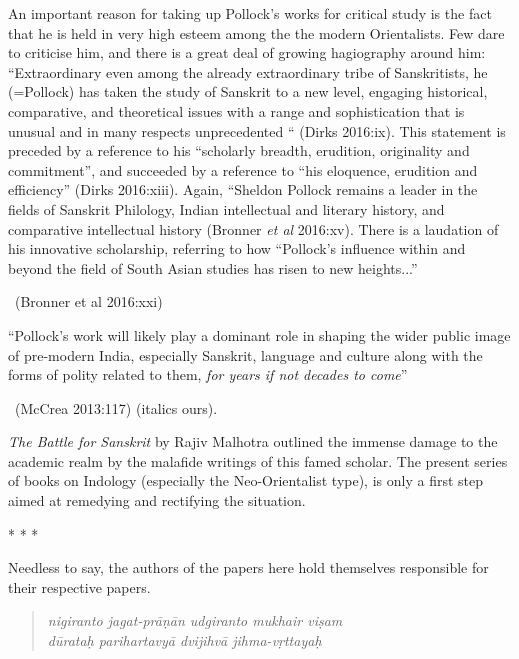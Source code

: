 \begin{myquote}
An important reason for taking up Pollock’s works for critical study is the fact that he is held in very high esteem among the the modern Orientalists. Few dare to criticise him, and there is a great deal of growing hagiography around him: “Extraordinary even among the already extraordinary tribe of Sanskritists, he (=Pollock) has taken the study of Sanskrit to a new level, engaging historical, comparative, and theoretical issues with a range and sophistication that is unusual and in many respects unprecedented “ (Dirks 2016:ix). This statement is preceded by a reference to his “scholarly breadth, erudition, originality and commitment”, and succeeded by a reference to “his eloquence, erudition and efficiency” (Dirks 2016:xiii). Again, “Sheldon Pollock remains a leader in the fields of Sanskrit Philology, Indian intellectual and literary history, and comparative intellectual history (Bronner \textit{et al} 2016:xv). There is a laudation of his innovative scholarship, referring to how “Pollock’s influence within and beyond the field of South Asian studies has risen to new heights...” 

~\hfill (Bronner et al 2016:xxi)
\end{myquote}

\vskip -5pt

\begin{myquote}
“Pollock’s work will likely play a dominant role in shaping the wider public image of pre-modern India, especially Sanskrit, language and culture along with the forms of polity related to them, \textit{for years if not decades to come}” 

~\hfill (McCrea 2013:117) (italics ours).
\end{myquote}

\textit{The Battle for Sanskrit} by Rajiv Malhotra outlined the immense damage to the academic realm by the malafide writings of this famed scholar. The present series of books on Indology (especially the Neo-Orientalist type), is only a first step aimed at remedying and rectifying the situation.

\begin{center}
* * *
\end{center}

Needless to say, the authors of the papers here hold themselves responsible for their respective papers.

\begin{verse}
\textit{nigiranto jagat-prāṇān udgiranto mukhair viṣam}  \\\textit{dūrataḥ parihartavyā dvijihvā jihma-vṛttayaḥ} 
\end{verse}

